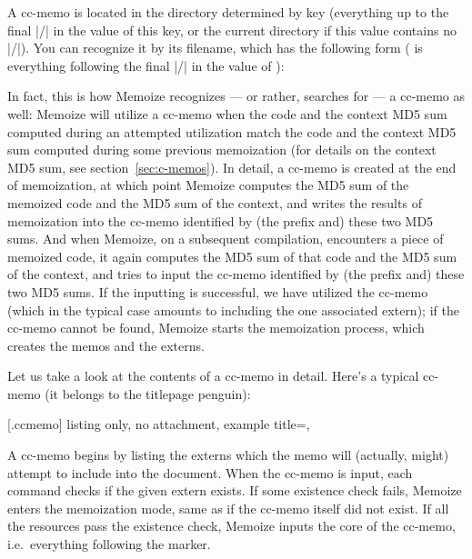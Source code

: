 \documentclass[a4paper,11pt]{article}
\def\exampledir{examples/}
\begin{document}
A cc-memo is located in the directory determined by key 
(everything up to the final |/| in the value of this key, or the current
directory if this value contains no |/|).  You can recognize it by its
filename, which has the following form ( is everything
following the final |/| in the value of ):
\begin{center}
\end{center}

In fact, this is how Memoize recognizes --- or rather, searches for --- a
cc-memo as well: Memoize will utilize a cc-memo when the code and the context
MD5 sum computed during an attempted utilization match the code and the context
MD5 sum computed during some previous memoization (for details on the context
MD5 sum, see section~\ref{sec:c-memos}).  In detail, a cc-memo is created at
the end of memoization, at which point Memoize computes the MD5 sum of the
memoized code and the MD5 sum of the context, and writes the results of
memoization into the cc-memo identified by (the prefix and) these two MD5 sums.
And when Memoize, on a subsequent compilation, encounters a piece of memoized
code, it again computes the MD5 sum of that code and the MD5 sum of the
context, and tries to input the cc-memo identified by (the prefix and) these
two MD5 sums.  If the inputting is successful, we have utilized the cc-memo
(which in the typical case amounts to including the one associated extern); if
the cc-memo cannot be found, Memoize starts the memoization process, which
creates the memos and the externs.

Let us take a look at the contents of a cc-memo in detail.  Here's a typical
cc-memo (it belongs to the titlepage penguin):

\begingroup
{}[.ccmemo]{
  listing only,
  no attachment,
  example title=\mymemo,
}
\endgroup

A cc-memo begins by listing the externs which the memo will (actually, might)
attempt to include into the document.  When the cc-memo is input, each
 command checks if the given extern exists.  If some
existence check fails, Memoize enters the memoization mode, same as if the
cc-memo itself did not exist.  If all the resources pass the existence check,
Memoize inputs the core of the cc-memo, i.e.\ everything following the
 marker.
\end{document}

